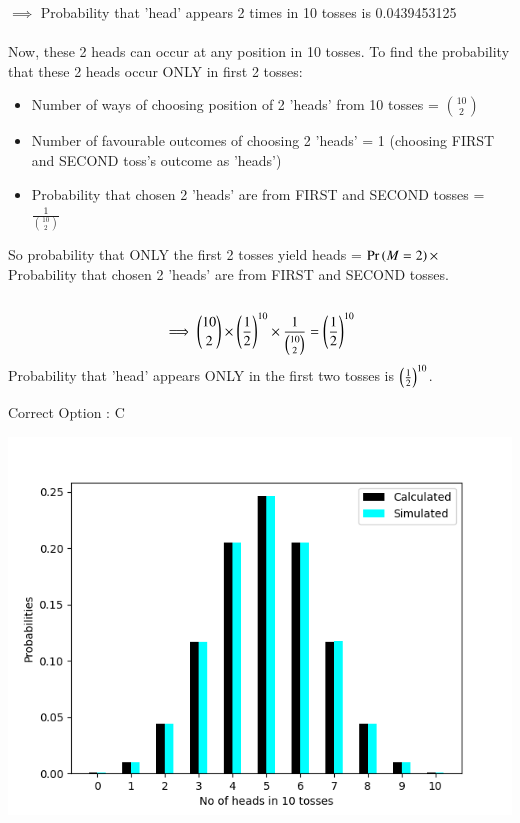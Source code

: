 \documentclass[journal,12pt,twocolumn]{IEEEtran}
\begin{document}
$\implies$ Probability that 'head' appears 2 times in 10 tosses is 0.0439453125\\\\
Now, these 2 heads can occur at any position in 10 tosses. To find the probability that these 2 heads occur ONLY in first 2 tosses:\\
\begin{itemize}
    \item Number of ways of choosing position of 2 'heads' from 10 tosses =
    ${{10}\choose{2}}$\\
    \item Number of favourable outcomes of choosing 2 'heads' = 1
    (choosing FIRST and SECOND toss's outcome as 'heads')\\
    \item Probability that chosen 2 'heads' are from FIRST and SECOND tosses = $\frac{1}{{{10}\choose{2}}}$\\
\end{itemize}
So probability that ONLY the first 2 tosses yield heads =  $\Pr\left(M = 2\right) \times$ Probability that chosen 2 'heads' are from FIRST and SECOND tosses.\\\\
\begin{align}
\implies {{10}\choose{2}} \times \left(\frac{1}{2}\right)^{10} \times \frac{1}{{{10}\choose{2}}} = \left(\frac{1}{2}\right)^{10}\notag
\end{align}
Probability that 'head' appears ONLY in the first two tosses is $\left(\frac{1}{2}\right)^{10}$.
\begin{center}
    Correct Option : C
\end{center}
\pagebreak
\includegraphics{Figure-1.png}
\end{document}
